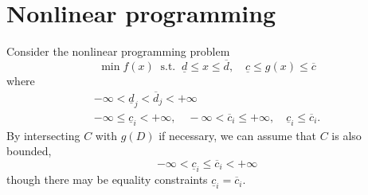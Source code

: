 \documentclass[11pt,a4paper]{article}
\newcommand{\cl}{{\underline{c}}}
\newcommand{\dl}{{\underline{d}}}
\newcommand{\cu}{{\overline{c}}}
\newcommand{\du}{{\overline{d}}}
\newcommand{\x}{x}
\begin{document}
\section*{Nonlinear programming}

Consider the nonlinear programming problem
\[ \min f(x) \ \text{ s.t. } \ \dl\leq\x\leq\du, \quad \cl\leq g(x)\leq\cu \]
where
\[ \begin{gathered} 
      -\infty < \dl_j < \du_j < +\infty \\
      -\infty \leq \cl_i < +\infty, \quad -\infty<\cu_i\leq+\infty, \quad \cl_i\leq \cu_i. 
   \end{gathered} \]
By intersecting $C$ with $g(D)$ if necessary, we can assume that $C$ is also bounded, 
\[ -\infty < \cl_i \leq \cu_i < +\infty \]
though there may be equality constraints $\cl_i=\cu_i$.
\end{document}
